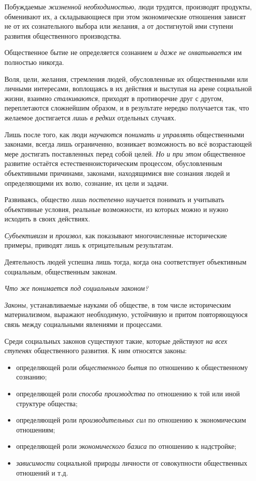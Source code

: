 \documentclass[a4paper,14pt,russian]{extreport}
\begin{document}
Побуждаемые \emph{жизненной необходимостью}, люди трудятся, производят продукты, обменивают их, а складывающиеся при этом экономические отношения зависят не от их сознательного выбора или желания, а от достигнутой ими ступени развития общественного производства.

Общественное бытие не определяется сознанием \emph{и даже не охватывается} им полностью никогда.

Воля, цели, желания, стремления людей, обусловленные их общественными или личными интересами, воплощаясь в их действия и выступая на арене социальной жизни, взаимно \emph{сталкиваются}, приходят в противоречие друг с другом, переплетаются сложнейшим образом, и в результате нередко получается так, что желаемое достигается \emph{лишь в редких} отдельных случаях.

Лишь после того, как люди \emph{научаются понимать и управлять} общественными законами, всегда лишь ограниченно, возникает возможность во всё возрастающей мере достигать поставленных перед собой целей. \emph{Но и при этом} общественное развитие остаётся естественноисторическим процессом, обусловленным объективными причинами, законами, находящимися вне сознания людей и определяющими их волю, сознание, их цели и задачи.

Развиваясь, общество \emph{лишь постепенно} научается понимать и учитывать объективные условия, реальные возможности, из которых можно и нужно исходить в своих действиях.

\emph{Субъективизм} и \emph{произвол}, как показывают многочисленные исторические примеры, приводят лишь к отрицательным результатам.

Деятельность людей успешна лишь тогда, когда она соответствует объективным социальным, общественным законам.

\emph{Что же понимается под социальным законом?}

\emph{Законы}, устанавливаемые науками об обществе, в том числе историческим материализмом, выражают необходимую, устойчивую и притом повторяющуюся связь между социальными явлениями и процессами.

Среди социальных законов существуют такие, которые действуют \emph{на всех} \emph{ступенях} общественного развития. К ним относятся законы:

\begin{itemize}
\item определяющей роли \emph{общественного бытия} по отношению к общественному сознанию;
\item определяющей роли \emph{способа производства} по отношению к той или иной структуре общества;
\item определяющей роли \emph{производительных сил} по отношению к экономическим отношениям;
\item определяющей роли \emph{экономического базиса} по отношению к надстройке;
\item \emph{зависимости} социальной природы личности от совокупности общественных отношений и т.д.
\end{itemize}
\end{document}
